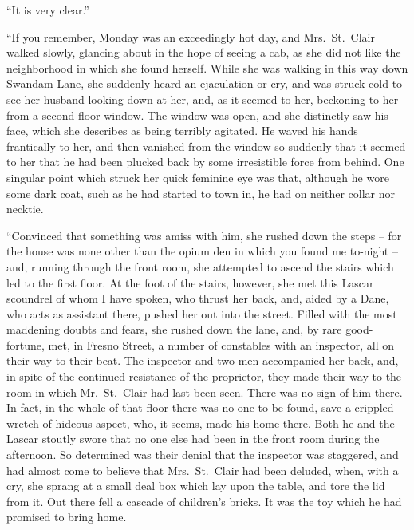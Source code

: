 “It is very clear.”

“If you remember, Monday was an exceedingly hot day,
and Mrs.~St.~Clair walked slowly, glancing about in the hope
of seeing a cab, as she did not like the neighborhood in
which she found herself. While she was walking in this way
down Swandam Lane, she suddenly heard an ejaculation or
cry, and was struck cold to see her husband looking down at
her, and, as it seemed to her, beckoning to her from a second-floor
window. The window was open, and she distinctly saw
his face, which she describes as being terribly agitated. He
waved his hands frantically to her, and then vanished from
the window so suddenly that it seemed to her that he had
been plucked back by some irresistible force from behind.
One singular point which struck her quick feminine eye was
that, although he wore some dark coat, such as he had started
to town in, he had on neither collar nor necktie.

“Convinced that something was amiss with him, she rushed
down the steps -- for the house was none other than the opium
den in which you found me to-night -- and, running through
the front room, she attempted to ascend the stairs which led
to the first floor. At the foot of the stairs, however, she met
this Lascar scoundrel of whom I have spoken, who thrust her
back, and, aided by a Dane, who acts as assistant there,
pushed her out into the street. Filled with the most maddening
doubts and fears, she rushed down the lane, and, by
rare good-fortune, met, in Fresno Street, a number of constables
with an inspector, all on their way to their beat. The
inspector and two men accompanied her back, and, in spite of
the continued resistance of the proprietor, they made their
way to the room in which Mr.~St.~Clair had last been seen.
There was no sign of him there. In fact, in the whole of that
floor there was no one to be found, save a crippled wretch of
hideous aspect, who, it seems, made his home there. Both he
and the Lascar stoutly swore that no one else had been in the
front room during the afternoon. So determined was their
denial that the inspector was staggered, and had almost come
to believe that Mrs.~St.~Clair had been deluded, when, with a
cry, she sprang at a small deal box which lay upon the table,
and tore the lid from it. Out there fell a cascade of children’s
bricks. It was the toy which he had promised to
bring home.

